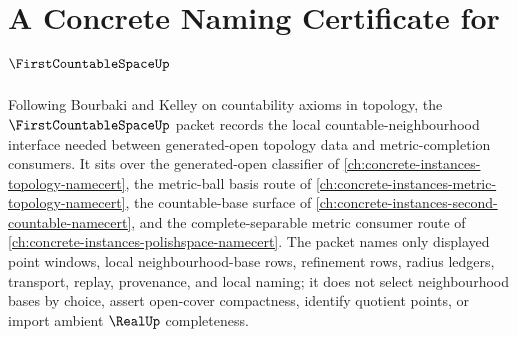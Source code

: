 \chapter{A Concrete Naming Certificate for $\FirstCountableSpaceUp$}
\label{ch:concrete-instances-first-countable-space-namecert}

Following Bourbaki and Kelley on countability axioms in topology, the $\FirstCountableSpaceUp$ packet records the local countable-neighbourhood interface needed between generated-open topology data and metric-completion consumers. It sits over the generated-open classifier of \autoref{ch:concrete-instances-topology-namecert}, the metric-ball basis route of \autoref{ch:concrete-instances-metric-topology-namecert}, the countable-base surface of \autoref{ch:concrete-instances-second-countable-namecert}, and the complete-separable metric consumer route of \autoref{ch:concrete-instances-polishspace-namecert}. The packet names only displayed point windows, local neighbourhood-base rows, refinement rows, radius ledgers, transport, replay, provenance, and local naming; it does not select neighbourhood bases by choice, assert open-cover compactness, identify quotient points, or import ambient $\RealUp$ completeness.

